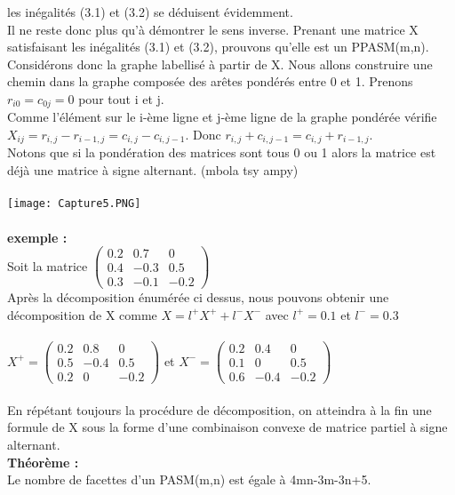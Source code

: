\documentclass{book}
\begin{document}
les inégalités (3.1) et (3.2) se déduisent évidemment. \\
Il ne reste donc plus qu'à démontrer le sens inverse. Prenant une matrice X satisfaisant les inégalités (3.1) et (3.2), prouvons qu'elle est un PPASM(m,n).\\
Considérons donc la graphe labellisé à partir de X. Nous allons construire une chemin dans la graphe composée des arêtes pondérés entre 0 et 1. Prenons $r_{i0}=c_{0j}=0$ pour tout i et j. \\
Comme l'élément sur le i-ème ligne et j-ème ligne de la graphe pondérée vérifie $X_{ij}=r_{i,j}-r_{i-1,j}=c_{i,j}-c_{i,j-1}$. Donc $r_{i,j}+c_{i,j-1}=c_{i,j}+r_{i-1,j}$.\\
Notons que si la pondération des matrices sont tous 0 ou 1 alors la matrice est déjà une matrice à signe alternant. (mbola tsy ampy)\\
\\
\texttt{[image: Capture5.PNG]} \\\\
\textbf{exemple : }\\
Soit la matrice 
$\begin{pmatrix}
  0.2&0.7&0\\0.4&-0.3&0.5\\0.3&-0.1&-0.2
 \end{pmatrix}$ \\
 Après la décomposition énumérée ci dessus, nous pouvons obtenir une décomposition de X comme $X=l^+X^+ + l^-X^-$ avec $l^+=0.1$ et $l^-=0.3$ \\\\ $X^+=\begin{pmatrix}
  0.2&0.8&0\\0.5&-0.4&0.5\\0.2&0&-0.2
 \end{pmatrix} $ et $X^-=\begin{pmatrix}
  0.2&0.4&0\\0.1&0&0.5\\0.6&-0.4&-0.2
 \end{pmatrix} $ \\\\En répétant toujours la procédure de décomposition, on atteindra à la fin une formule de X sous la forme d'une combinaison convexe de matrice partiel à signe alternant. \\
\textbf{Théorème : }\\
Le nombre de facettes d'un PASM(m,n) est égale à 4mn-3m-3n+5.\\
\end{document}
